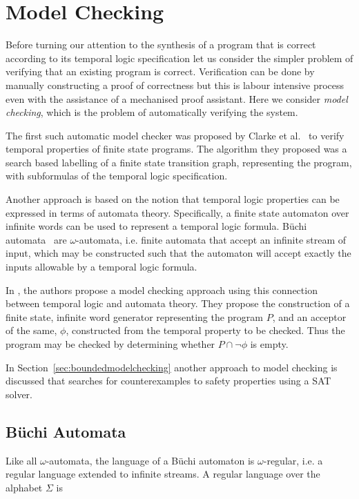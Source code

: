 \section{Model Checking}

Before turning our attention to the synthesis of a program that is correct according to its temporal logic specification let us consider the simpler problem of verifying that an existing program is correct. Verification can be done by manually constructing a proof of correctness but this is labour intensive process even with the assistance of a mechanised proof assistant. Here we consider \emph{model checking}, which is the problem of automatically verifying the system.

The first such automatic model checker was proposed by Clarke et al.~\cite{Clarke86} to verify temporal properties of finite state programs. The algorithm they proposed was a search based labelling of a finite state transition graph, representing the program, with subformulas of the temporal logic specification. 

Another approach is based on the notion that temporal logic properties can be
expressed in terms of automata theory. Specifically, a finite state automaton
over infinite words can be used to represent a temporal logic formula. B\"uchi
automata~\cite{Buchi62} are $\omega$-automata, i.e. finite automata that accept
an infinite stream of input, which may be constructed such that the automaton
will accept exactly the inputs allowable by a temporal logic formula.

In \cite{Vardi96}, the authors propose a model checking approach using this
connection between temporal logic and automata theory. They propose the
construction of a finite state, infinite word generator representing the
program $P$, and an acceptor of the same, $\phi$, constructed from the temporal
property to be checked. Thus the program may be checked by determining whether $P \cap \lnot \phi$ is empty.


In Section~\ref{sec:boundedmodelchecking} another approach to model checking is discussed that searches for counterexamples to safety properties using a SAT solver.

\subsection{B\"uchi Automata}

Like all $\omega$-automata, the language of a B\"uchi automaton is
$\omega$-regular, i.e. a regular language extended to infinite streams. A
regular language over the alphabet $\Sigma$ is

